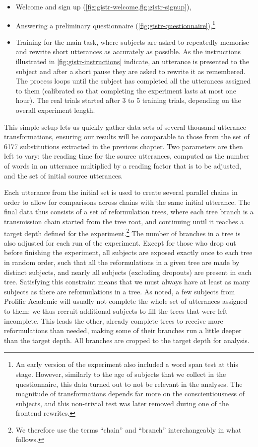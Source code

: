 \begin{itemize}
\item
  Welcome and sign up (\cref{fig:gistr-welcome,fig:gistr-signup}),
\item
  Answering a preliminary questionnaire
  (\cref{fig:gistr-questionnaire}),\footnote{An early version of the
    experiment also included a word span test at this stage. However,
    similarly to the age of subjects that we collect in the
    questionnaire, this data turned out to not be relevant in the
    analyses. The magnitude of transformations depends far more on the
    conscientiousness of subjects, and this non-trivial test was later
    removed during one of the frontend rewrites.}
\item
  Training for the main task, where subjects are asked to repeatedly
  memorise and rewrite short utterances as accurately as possible. As
  the instructions illustrated in \cref{fig:gistr-instructions}
  indicate, an utterance is presented to the subject and after a short
  pause they are asked to rewrite it as remembered. The process loops
  until the subject has completed all the utterances assigned to them
  (calibrated so that completing the experiment lasts at most one hour).
  The real trials started after 3 to 5 training trials, depending on the
  overall experiment length.
\end{itemize}

This simple setup lets us quickly gather data sets of several thousand
utterance transformations, ensuring our results will be comparable to
those from the set of \num{6177} substitutions extracted in the previous
chapter. Two parameters are then left to vary: the reading time for the
source utterances, computed as the number of words in an utterance
multiplied by a reading factor that is to be adjusted, and the set of
initial source utterances.

Each utterance from the initial set is used to create several parallel
chains in order to allow for comparisons across chains with the same
initial utterance. The final data thus consists of a set of
reformulation trees, where each tree branch is a transmission chain
started from the tree root, and continuing until it reaches a target
depth defined for the experiment.\footnote{We therefore use the terms
  \enquote{chain} and \enquote{branch} interchangeably in what follows.}
The number of branches in a tree is also adjusted for each run of the
experiment. Except for those who drop out before finishing the
experiment, all subjects are exposed exactly once to each tree in random
order, such that all the reformulations in a given tree are made by
distinct subjects, and nearly all subjects (excluding dropouts) are
present in each tree. Satisfying this constraint means that we must
always have at least as many subjects as there are reformulations in a
tree. As noted, a few subjects from Prolific Academic will usually not
complete the whole set of utterances assigned to them; we thus recruit
additional subjects to fill the trees that were left incomplete. This
leads the other, already complete trees to receive more reformulations
than needed, making some of their branches run a little deeper than the
target depth. All branches are cropped to the target depth for analysis.

